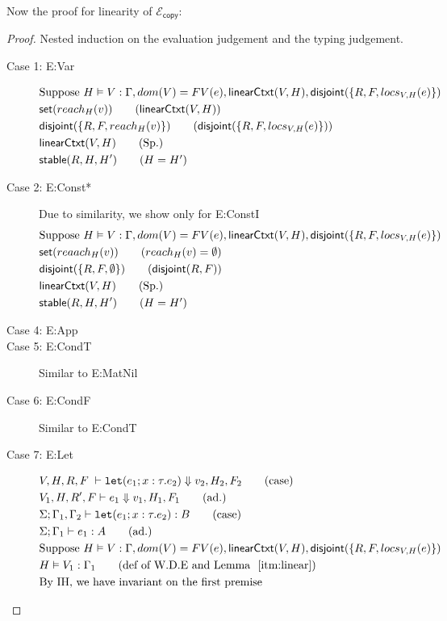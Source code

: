 \documentclass{easychair}
\newcommand{\ms}[1]{\ensuremath{\mathsf{#1}}}
\newcommand{\irl}[1]{\mathtt{#1}}
\newcommand{\na}[1]{\mathsf{linearCtxt}(#1)}
\newcommand{\stable}[1]{\mathsf{stable}(#1)}
\newcommand{\dist}[1]{\mathsf{disjoint}(#1)}
\newcommand{\copySem}{\ensuremath{\mathcal{E}_{\ms{copy}}}}
\theoremstyle{definition}
\begin{document}
Now the proof for linearity of \copySem{}:
\begin{proof}
Nested induction on the evaluation judgement and the typing judgement.\\
\begin{description}
  \item[Case 1: E:Var]
  \begin{align*}
  &\text{Suppose } H \vDash V : \Gamma, dom(V) = FV(e), \na{V,H}, \dist{\{R,F,locs_{V,H}(e)\}}\\
  &\ms{set}(reach_{H}(v)) \tag{$\na{V,H}$}\\
  &\dist{\{R,F,reach_{H}(v)\}} \tag{$\dist{\{R,F,locs_{V,H}(e)\}}$}\\
  &\na{V,H} \tag{Sp.}\\
  &\stable{R,H,H'} \tag{$H = H'$}
  \end{align*}
  \item[Case 2: E:Const*]
  Due to similarity, we show only for E:ConstI
  \begin{align*}
  &\text{Suppose } H \vDash V : \Gamma, dom(V) = FV(e), \na{V,H},\dist{\{R,F,locs_{V,H}(e)\}}\\
  &\ms{set}(reaach_{H}(v)) \tag{$reach_H(v) = \emptyset$}\\
  &\dist{\{R,F,\emptyset\}} \tag{$\dist{R,F}$}\\
  &\na{V,H} \tag{Sp.}\\
  &\stable{R,H,H'} \tag{$H = H'$}
  \end{align*}
  \item[Case 4: E:App]
  \item[Case 5: E:CondT] Similar to E:MatNil
  \item[Case 6: E:CondF] Similar to E:CondT
  \item [Case 7: E:Let]
  \begin{align*}
  &V,H,R,F \; \vdash \irl{let}(e_1; x : \tau.e_2) \Downarrow v_2,H_2,F_2 \tag{case}\\
  &V_1,H,R',F \vdash e_1 \Downarrow v_1,H_1,F_1 \tag{ad.}\\
  &\Sigma; \Gamma_1,\Gamma_2 \vdash \irl{let}(e_1; x : \tau.e_2) : B \tag{case}\\
  &\Sigma; \Gamma_1 \vdash e_1 : A \tag{ad.}\\
  &\text{Suppose } H \vDash V : \Gamma, dom(V) = FV(e), \na{V,H}, \dist{\{R,F,locs_{V,H}(e)\}}\\ 
  &H \vDash V_1 : \Gamma_1 \tag{def of W.D.E and Lemma $~\ref{itm:linear}$}\\
		&\text{By IH, we have invariant on the first premise}\\

\end{align*}
\end{description}
\end{proof}
\end{document}
